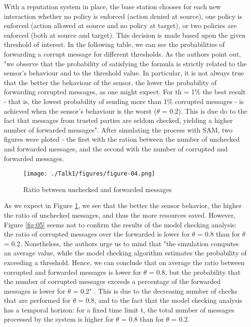 \documentclass[12pt,a4paper,twoside]{report}
\begin{document}
With a reputation system in place, the base station chooses for each new interaction whether no policy is enforced (action denied at source), one policy is enforced (action allowed at source and no policy at target), or two policies are enforced (both at source and target). This decision is made based upon the given threshold of interest. In the following table, we can see the probabilities of forwarding a corrupt message for different thresholds. As the authors point out, "we observe that the probability of satisfying the formula is strictly related to the sensor's behaviour and to the threshold value. In particular, it is not always true that the better the behaviour of the sensor, the lower the probability of forwarding corrupted messages, as one might expect. For th = 1\% the best result - that is, the lowest probability of sending more than 1\% corrupted messages - is achieved when the sensor's behaviour is the worst ($\theta$ = 0.2). This is due do to the fact that messages from trusted parties are seldom checked, yielding a higher number of forwarded messages". After simulating the process with SAM, two figures were ploted - the first with the ration between the number of unchecked and forwarded messages, and the second with the number of corrupted and forwarded messages.\par

\begin{figure}[ht]
	\begin{center}
  \texttt{[image: ./Talk1/figures/figure-04.png]}
  \end{center}
  \caption{Ratio between unchecked and forwarded messages \cite{vigo;etal:2014}}
  \label{fig:04}
\end{figure}

As we expect in Figure \ref{fig:04}, we see that the better the sensor behavior, the higher the ratio of unchecked messages, and thus the more resources saved. However, Figure \ref{fig:05} seems not to confirm the results of the model checking analysis: the ratio of corrupted messages over the forwarded is lower for $\theta$ = 0.8 than for $\theta$ = 0.2. Nonetheless, the authors urge us to mind that "the simulation computes an average value, while the model checking algorithm estimates the probability of exceeding a threshold. Hence, we can conclude that on average the ratio between corrupted and forwarded messages is lower for $\theta$ = 0.8, but the probability that the number of corrupted messages exceeds a percentage of the forwarded messages is lower for $\theta$ = 0.2" \cite{vigo;etal:2014}. This is due to the decreasing number of checks that are performed for $\theta$ = 0.8, and to the fact that the model checking analysis has a temporal horizon: for a fixed time limit t, the total number of messages processed by the system is higher for $\theta$ = 0.8 than for $\theta$ = 0.2.\par
\end{document}
